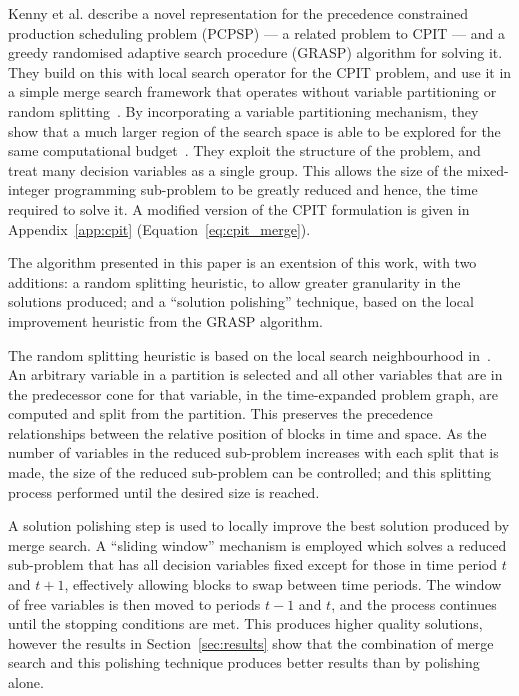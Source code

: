 \documentclass[journal]{IEEEtran}
\begin{document}
Kenny et al. \cite{gecco17} describe a novel representation for the precedence constrained production scheduling problem (PCPSP) --- a related problem to CPIT --- and a greedy randomised adaptive search procedure (GRASP) algorithm for solving it. They build on this with local search operator for the CPIT problem, and use it in a simple merge search framework that operates without variable partitioning or random splitting~\cite{gecco18}. By incorporating a variable partitioning mechanism, they show that a much larger region of the search space is able to be explored for the same computational budget~\cite{gecco19}. They exploit the structure of the problem, and treat many decision variables as a single group. This allows the size of the mixed-integer programming sub-problem to be greatly reduced and hence, the time required to solve it. A modified version of the CPIT formulation is given in Appendix~\ref{app:cpit} (Equation~\ref{eq:cpit_merge}).

The algorithm presented in this paper is an exentsion of this work, with two additions: a random splitting heuristic, to allow greater granularity in the solutions produced; and a ``solution polishing'' technique, based on the local improvement heuristic from the GRASP algorithm.

The random splitting heuristic is based on the local search neighbourhood in~\cite{gecco18}. An arbitrary variable in a partition is selected and all other variables that are in the predecessor cone for that variable, in the time-expanded problem graph, are computed and split from the partition. This preserves the precedence relationships between the relative position of blocks in time and space. As the number of variables in the reduced sub-problem increases with each split that is made, the size of the reduced sub-problem can be controlled; and this splitting process performed until the desired size is reached.

A solution polishing step is used to locally improve the best solution produced by merge search. A ``sliding window'' mechanism is employed which solves a reduced sub-problem that has all decision variables fixed except for those in time period $t$ and $t+1$, effectively allowing blocks to swap between time periods. The window of free variables is then moved to periods $t-1$ and $t$, and the process continues until the stopping conditions are met. This produces higher quality solutions, however the results in Section~\ref{sec:results} show that the combination of merge search and this polishing technique produces better results than by polishing alone.
\end{document}
